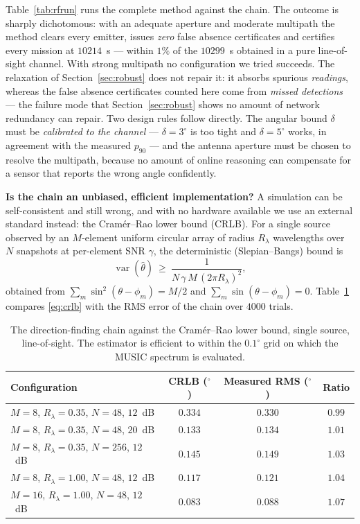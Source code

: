 \documentclass[preprint,12pt,3p]{elsarticle}
\theoremstyle{definition}
\begin{document}
Table~\ref{tab:rfrun} runs the complete method against the chain. The outcome is sharply
dichotomous: with an adequate aperture and moderate multipath the method clears every emitter,
issues \emph{zero} false absence certificates and certifies every mission at $10214$~s ---
within $1\%$ of the $10299$~s obtained in a pure line-of-sight channel. With
strong multipath no configuration we tried succeeds. The relaxation of
Section~\ref{sec:robust} does not repair it: it absorbs spurious \emph{readings}, whereas the
false absence certificates counted here come from \emph{missed detections} --- the failure mode
that Section~\ref{sec:robust} shows no amount of network redundancy can repair. Two design rules follow directly. The angular bound $\delta$ must be
\emph{calibrated to the channel} --- $\delta=3^\circ$ is too tight and $\delta=5^\circ$ works, in
agreement with the measured $p_{90}$ --- and the antenna aperture must be chosen to resolve the
multipath, because no amount of online reasoning can compensate for a sensor that reports the
wrong angle confidently.


\noindent\textbf{Is the chain an unbiased, efficient implementation?} A simulation can be
self-consistent and still wrong, and with no hardware available we use an external standard
instead: the Cram\'er--Rao lower bound (CRLB). For a single source observed by an $M$-element
uniform circular array of radius $R_\lambda$ wavelengths over $N$ snapshots at per-element SNR
$\gamma$, the deterministic (Slepian--Bangs) bound is
\begin{equation}
\operatorname{var}(\hat\theta)\ \ge\ \frac{1}{N\,\gamma\,M\,(2\pi R_\lambda)^2},
\label{eq:crlb}
\end{equation}
obtained from $\sum_m\sin^2(\theta-\phi_m)=M/2$ and $\sum_m\sin(\theta-\phi_m)=0$. Table~\ref{tab:crlb}
compares \eqref{eq:crlb} with the RMS error of the chain over $4000$ trials.

\begin{table}[t]
\caption{The direction-finding chain against the Cram\'er--Rao lower bound, single source,
line-of-sight. The estimator is efficient to within the $0.1^\circ$ grid on which the MUSIC
spectrum is evaluated.}
\label{tab:crlb}
\centering
\small
\begin{tabular}{lccc}
\toprule
Configuration & CRLB ($^\circ$) & Measured RMS ($^\circ$) & Ratio \\
\midrule
$M{=}8$, $R_\lambda{=}0.35$, $N{=}48$, $12$~dB   & $0.334$ & $0.330$ & $0.99$ \\
$M{=}8$, $R_\lambda{=}0.35$, $N{=}48$, $20$~dB   & $0.133$ & $0.134$ & $1.01$ \\
$M{=}8$, $R_\lambda{=}0.35$, $N{=}256$, $12$~dB  & $0.145$ & $0.149$ & $1.03$ \\
$M{=}8$, $R_\lambda{=}1.00$, $N{=}48$, $12$~dB   & $0.117$ & $0.121$ & $1.04$ \\
$M{=}16$, $R_\lambda{=}1.00$, $N{=}48$, $12$~dB  & $0.083$ & $0.088$ & $1.07$ \\
\bottomrule
\end{tabular}
\end{table}
\end{document}
